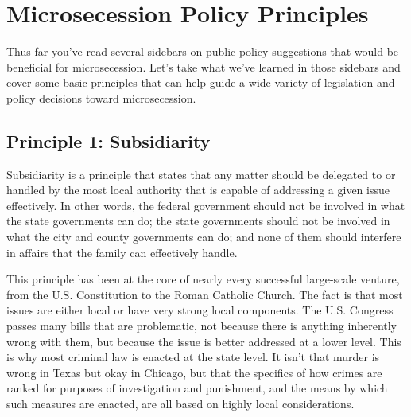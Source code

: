 \chapter{Microsecession Policy Principles}
\label{chap_policy_principles}

Thus far you’ve read
several sidebars on public policy suggestions that would be beneficial
for microsecession.
Let’s take what we’ve
learned in those sidebars and cover some basic principles that can
help guide a wide variety of legislation and policy decisions toward
microsecession.

\section{Principle 1: Subsidiarity}

Subsidiarity is a principle that states that any matter should be
delegated to or handled by the most local authority that is capable of
addressing a given issue effectively. In other words, the federal
government should not be involved in what the state governments can do;
the state governments should not be involved in what the city and
county governments can do;
and none of them
should interfere in affairs that the family can effectively handle.

This principle has been at the core of nearly every successful
large-scale venture, from the U.S. Constitution to the Roman Catholic
Church. The fact is that most issues are either local or have very
strong local components. The U.S. Congress passes many bills
that are problematic, not because there is anything inherently wrong
with them, but because the issue is better addressed at a lower level.
This is why most criminal law is enacted at the state level. It
isn't that murder is wrong
in Texas but okay in Chicago, but that the specifics of how crimes are
ranked for purposes of investigation and punishment, and the means by
which such measures are enacted, are all based on highly local
considerations.

